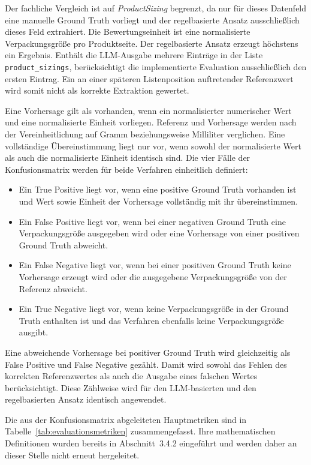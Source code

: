 Der fachliche Vergleich ist auf \textit{ProductSizing} begrenzt, da nur für dieses Datenfeld eine manuelle Ground Truth vorliegt und der regelbasierte Ansatz ausschließlich dieses Feld extrahiert. Die Bewertungseinheit ist eine normalisierte Verpackungsgröße pro Produktseite. Der regelbasierte Ansatz erzeugt höchstens ein Ergebnis. Enthält die LLM-Ausgabe mehrere Einträge in der Liste \texttt{product\_sizings}, berücksichtigt die implementierte Evaluation ausschließlich den ersten Eintrag. Ein an einer späteren Listenposition auftretender Referenzwert wird somit nicht als korrekte Extraktion gewertet.

Eine Vorhersage gilt als vorhanden, wenn ein normalisierter numerischer Wert und eine normalisierte Einheit vorliegen. Referenz und Vorhersage werden nach der Vereinheitlichung auf Gramm beziehungsweise Milliliter verglichen. Eine vollständige Übereinstimmung liegt nur vor, wenn sowohl der normalisierte Wert als auch die normalisierte Einheit identisch sind. Die vier Fälle der Konfusionsmatrix werden für beide Verfahren einheitlich definiert:

\begin{itemize}
    \item Ein True Positive liegt vor, wenn eine positive Ground Truth vorhanden ist und Wert sowie Einheit der Vorhersage vollständig mit ihr übereinstimmen.
    \item Ein False Positive liegt vor, wenn bei einer negativen Ground Truth eine Verpackungsgröße ausgegeben wird oder eine Vorhersage von einer positiven Ground Truth abweicht.
    \item Ein False Negative liegt vor, wenn bei einer positiven Ground Truth keine Vorhersage erzeugt wird oder die ausgegebene Verpackungsgröße von der Referenz abweicht.
    \item Ein True Negative liegt vor, wenn keine Verpackungsgröße in der Ground Truth enthalten ist und das Verfahren ebenfalls keine Verpackungsgröße ausgibt.
\end{itemize}

Eine abweichende Vorhersage bei positiver Ground Truth wird gleichzeitig als False Positive und False Negative gezählt. Damit wird sowohl das Fehlen des korrekten Referenzwertes als auch die Ausgabe eines falschen Wertes berücksichtigt. Diese Zählweise wird für den LLM-basierten und den regelbasierten Ansatz identisch angewendet.

Die aus der Konfusionsmatrix abgeleiteten Hauptmetriken sind in Tabelle~\ref{tab:evaluationsmetriken} zusammengefasst. Ihre mathematischen Definitionen wurden bereits in Abschnitt~3.4.2 eingeführt und werden daher an dieser Stelle nicht erneut hergeleitet.

